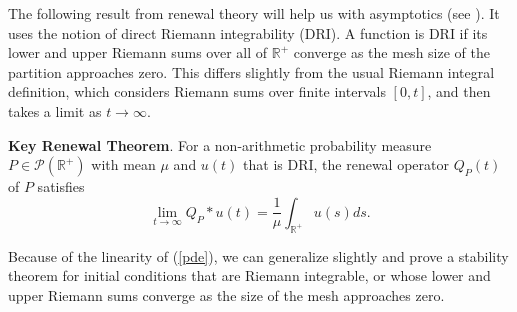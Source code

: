  
 
The following result from renewal theory will help us with asymptotics (see \cite{serfozo2009renewal}). It uses the notion of direct Riemann integrability (DRI).  A function is DRI if its  lower and upper Riemann sums  over all of $\mathbb{R}^+$ converge as the mesh size of the partition approaches zero.  This differs slightly from the usual Riemann integral definition, which considers Riemann sums over finite intervals $[0,t]$, and then takes a limit as $t\rightarrow \infty$.         



\begin{theorem}\label{krt}\textbf{Key Renewal Theorem}. For a non-arithmetic probability measure $P \in \mathcal P(\mathbb{R}^+)$ with mean $\mu$ and $u(t)$ that is DRI, the renewal operator $Q_P(t)$ of $P$ satisfies
\begin{equation}
\lim_{t\rightarrow \infty} Q_P *u(t) =\frac 1 \mu \int_{\mathbb{R}^+} u(s)ds.
\end{equation}
\end{theorem}
Because of the linearity of (\ref{pde}), we can generalize slightly and prove a stability theorem for initial conditions that are Riemann integrable, or whose lower and upper Riemann sums converge as the size of the mesh approaches zero.

